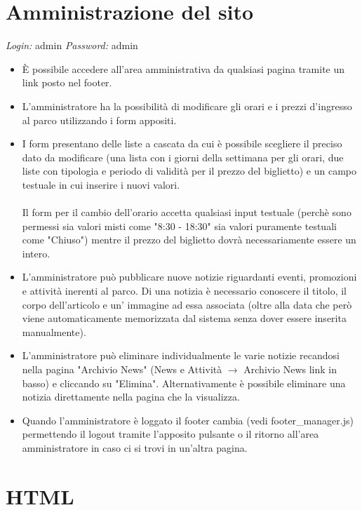 \documentclass[12pt]{article}
\begin{document}
\section{Amministrazione del sito}
\textit{Login:} admin \textit{Password:} admin
\begin{itemize}
\item \`E possibile accedere all'area amministrativa da qualsiasi pagina tramite un link posto nel footer.
\item L'amministratore ha la possibilit\`a di modificare gli orari e i prezzi d'ingresso al parco utilizzando i form appositi. 
\item I form presentano delle liste a cascata da cui \`e possibile scegliere il preciso dato da modificare (una lista con i giorni della settimana per gli orari, due liste con tipologia e periodo di validit\`a per il prezzo del biglietto) e un campo testuale in cui inserire i nuovi valori.\\ \\ Il form per il cambio dell'orario accetta qualsiasi input testuale (perch\`e sono permessi sia valori misti come "8:30 - 18:30" sia valori puramente testuali come "Chiuso") mentre il prezzo del biglietto dovr\`a necessariamente essere un intero.
\item L'amministratore pu\`o pubblicare nuove notizie riguardanti eventi, promozioni e attivit\`a inerenti al parco. Di una notizia \`e necessario conoscere il titolo, il corpo dell'articolo e un' immagine ad essa associata (oltre alla data che per\`o viene automaticamente memorizzata dal sistema senza dover essere inserita manualmente).
\item L'amministratore pu\`o eliminare individualmente le varie notizie recandosi nella pagina "Archivio News" (News e Attivit\`a $\rightarrow$ Archivio News link in basso) e cliccando su "Elimina". Alternativamente \`e possibile eliminare una notizia direttamente nella pagina che la visualizza.
\item Quando l'amministratore \`e loggato il footer cambia (vedi footer\_manager.js) permettendo il logout tramite l'apposito pulsante o il ritorno all'area amministratore in caso ci si trovi in un'altra pagina.
\end{itemize}

\newpage

			\section{HTML}
\end{document}
